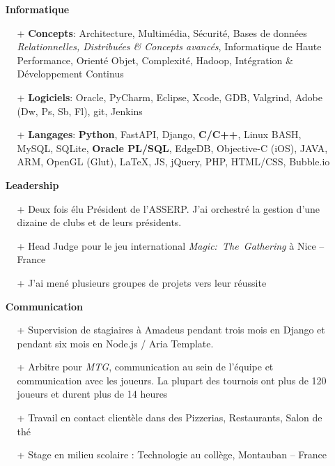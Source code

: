 \documentclass{res}
\begin{document}
\begin{resume}
	\begin{itemize}
	\item[] \faLaptopCode~\textbf{Informatique}
		\begin{itemize}
                  \item[+] \textbf{Concepts}: Architecture, Multim\'edia, S\'ecurit\'e, Bases de donn\'ees \textit{Relationnelles, Distribu\'ees \& Concepts avanc\'es}, Informatique de Haute Performance, Orient\'e Objet, Complexit\'e, Hadoop, Int\'egration \& D\'eveloppement Continus
                  \item[+] \textbf{Logiciels}: Oracle, PyCharm, Eclipse, Xcode, GDB, Valgrind, Adobe (Dw, Ps, Sb, Fl), git, Jenkins
                  \item[+] \textbf{Langages}: \textbf{Python}, FastAPI, Django, \textbf{C/C++}, Linux BASH, MySQL, SQLite, \textbf{Oracle PL/SQL}, EdgeDB, Objective-C (iOS), JAVA, ARM, OpenGL (Glut), \LaTeX{}, JS, jQuery, PHP, HTML/CSS, Bubble.io
		\end{itemize}    
	\end{itemize}

	\begin{itemize}
	\item[] \faHandshake[regular]~\textbf{Leadership}
		\begin{itemize}
			      \item[+] Deux fois \'elu Pr\'esident de l'ASSERP. J'ai orchestr\'e la gestion d'une dizaine de clubs et de leurs pr\'esidents.
                  \item[+] Head Judge pour le jeu international \textit{Magic:~The~Gathering} \`a Nice -- France
                  \item[+] J'ai men\'e plusieurs groupes de projets vers leur r\'eussite
		\end{itemize}   
	\end{itemize}
	
	\begin{itemize}
	\item[] \faComments[regular]~\textbf{Communication}
		\begin{itemize}
									\item[+] Supervision de stagiaires \`a Amadeus pendant trois mois en Django et pendant six mois en Node.js / Aria Template.
                  \item[+] Arbitre pour \textit{MTG}, communication au sein de l'\'equipe et communication avec les joueurs. La plupart des tournois ont plus de 120 joueurs et durent plus de 14 heures
                  \item[+] Travail en contact client\`ele dans des Pizzerias, Restaurants, Salon de th\'e
                  \item[+] Stage en milieu scolaire : Technologie au coll\`ege, Montauban -- France


\end{itemize}
\end{itemize}
\end{resume}
\end{document}
